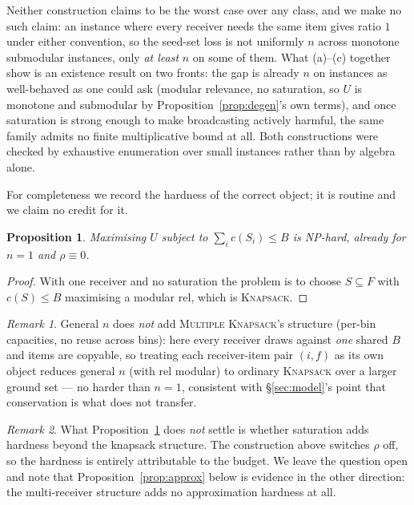 \documentclass[sigconf,anonymous]{aamas}
\newtheorem{proposition}{Proposition}
\theoremstyle{remark}
\newtheorem{remark}{Remark}
\begin{document}
Neither construction claims to be the worst case over any class, and
we make no such claim: an instance where every receiver needs the same
item gives ratio $1$ under either convention, so the seed-set loss is
not uniformly $n$ across monotone submodular instances, only
\emph{at least} $n$ on some of them. What (a)--(c) together show is an
existence result on two fronts: the gap is already $n$ on
instances as well-behaved as one could ask (modular relevance, no
saturation, so $U$ is monotone and submodular by
Proposition~\ref{prop:degen}'s own terms), and once saturation is
strong enough to make broadcasting actively harmful, the same family
admits no finite multiplicative bound at all. Both constructions were
checked by exhaustive enumeration over small instances rather than by
algebra alone.

For completeness we record the hardness of the correct object; it is
routine and we claim no credit for it.

\begin{proposition}
\label{prop:hard}
Maximising $U$ subject to $\sum_i c(S_i) \le B$ is NP-hard, already for
$n=1$ and $\rho \equiv 0$.
\end{proposition}

\begin{proof}
With one receiver and no saturation the problem is to choose
$S \subseteq F$ with $c(S) \le B$ maximising a modular $\mathrm{rel}$,
which is \textsc{Knapsack}.
\end{proof}

\begin{remark}
General $n$ does \emph{not} add \textsc{Multiple Knapsack}'s structure
(per-bin capacities, no reuse across bins): here every receiver draws
against \emph{one} shared $B$ and items are copyable, so treating each
receiver-item pair $(i,f)$ as its own object reduces general $n$ (with
$\mathrm{rel}$ modular) to ordinary \textsc{Knapsack} over a larger
ground set --- no harder than $n=1$, consistent with
\S\ref{sec:model}'s point that conservation is what does not transfer.
\end{remark}

\begin{remark}
What Proposition~\ref{prop:hard} does \emph{not} settle is whether
saturation adds hardness beyond the knapsack structure. The
construction above switches $\rho$ off, so the hardness is entirely
attributable to the budget. We leave the question open and note that
Proposition~\ref{prop:approx} below is evidence in the other
direction: the multi-receiver structure adds no approximation hardness
at all.
\end{remark}
\end{document}
